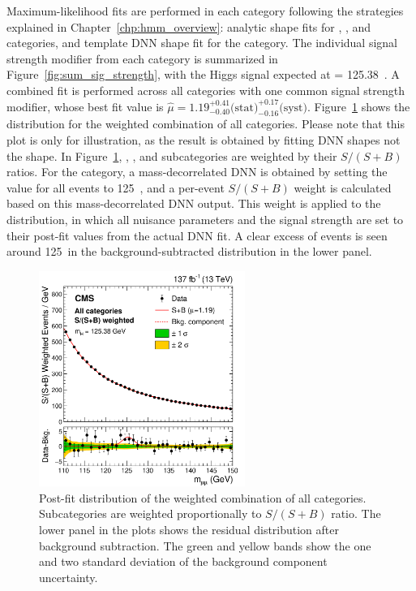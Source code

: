 Maximum-likelihood fits are performed in each category following the strategies explained in Chapter~\ref{chp:hmm_overview}:
analytic \mmm shape fits for \ggH, \ttH, and \VH categories, and template DNN shape fit for the \qqH category.
The individual signal strength modifier from each category is summarized in Figure~\ref{fig:sum_sig_strength},
with the Higgs signal expected at \mh = 125.38~\GeV.
A combined fit is performed across all categories with one common signal strength modifier, 
whose best fit value is $\hat{\mu} = 1.19^{+0.41}_{-0.40} \text{(stat)}^{+0.17}_{-0.16} \text{(syst)}$.
Figure~\ref{fig:sum_mass_shape} shows the \mmm distribution for the weighted combination of all categories.
Please note that this plot is only for illustration, as the \qqH result is obtained by fitting DNN shapes not the \mmm shape.
In Figure~\ref{fig:sum_mass_shape}, \ggH, \ttH, and \VH subcategories are weighted by their $S/(S+B)$ ratios.
For the \qqH category, a mass-decorrelated DNN is obtained by setting the \mmm value for all events to 125~\GeV,
and a per-event $S/(S+B)$ weight is calculated based on this mass-decorrelated DNN output. 
This weight is applied to the \qqH \mmm distribution, 
in which all nuisance parameters and the signal strength are set to their post-fit values from the actual DNN fit.
A clear excess of events is seen around 125~\GeV in the background-subtracted distribution in the lower panel.

\begin{figure}[!htb]
    \centering
    \captionsetup{justification=justified}
    \includegraphics[width=0.60\textwidth]{pics/results/sum_mass_dist.png}
    \caption{Post-fit \mmm distribution of the weighted combination of all categories.
             Subcategories are weighted proportionally to $S/(S+B)$ ratio. 
             The lower panel in the plots shows the residual distribution after background subtraction.
             The green and yellow bands show the one and two standard deviation of the background component uncertainty.}
    \label{fig:sum_mass_shape}
\end{figure}


